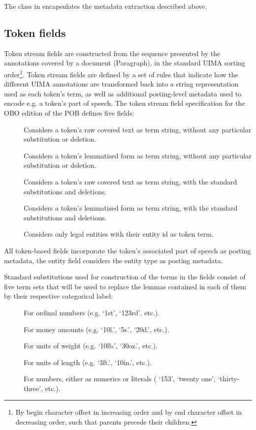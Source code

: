 The  class in  encapsulates the metadata extraction described above.

\subsection{Token fields}

Token stream fields are constructed from the sequence presented by the annotations covered by a document (Paragraph), in the standard UIMA sorting order\footnote{
    By begin character offset in increasing order and by end character offset in decreasing order, such that parents precede their children.
}.
Token stream fields are defined by a set of rules that indicate how the different UIMA annotations are transformed back into a string representation used as each token's term, as well as additional posting-level metadata used to encode e.g. a token's part of speech.
The token stream field specification for the OBO edition of the POB defines five fields:

\begin{description}
    \item [] Considers a token's raw covered text as term string, without any particular substitution or deletion.
    \item [] Considers a token's lemmatised form as term string, without any particular substitution or deletion.
    \item [] Considers a token's raw covered text as term string, with the standard substitutions and deletions.
    \item [] Considers a token's lemmatised form as term string, with the standard substitutions and deletions.
    \item [] Considers only legal entities with their entity id as token term.
\end{description}

All token-based fields incorporate the token's associated part of speech as posting metadata, the entity field considers the entity type as posting metadata.

Standard substitutions used for construction of the terms in the  fields consist of five term sets that will be used to replace the lemmas contained in each of them by their respective categorical label:
\begin{description}
    \item []    For ordinal numbers (e.g. `1st', `123rd', etc.).
    \item []  For money amounts (e.g. `10l.', `5s.', `20d.', etc.).
    \item [] For units of weight (e.g. `10lb.', `30oz.', etc.).
    \item [] For units of length (e.g. `3ft.', `10in.', etc.).
    \item [] For numbers, either as numerics or literals ( `153', `twenty one', `thirty-three', etc.).
\end{description}

